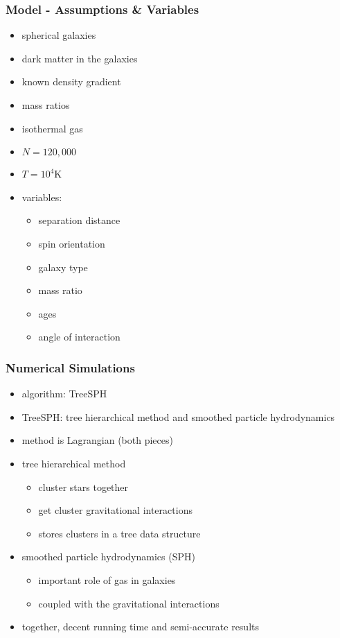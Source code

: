 \documentclass{beamer}
\begin{document}
\begin{frame}
  \frametitle{Model - Assumptions \& Variables}
  \begin{itemize}
    \item spherical galaxies
    \item dark matter in the galaxies
    \item known density gradient
    \item mass ratios
    \item isothermal gas
    \item $N = 120,000$
    \item $T = 10^4 $K
    \item variables:
    \begin{itemize}
      \item separation distance
      \item spin orientation
      \item galaxy type
      \item mass ratio
      \item ages
      \item angle of interaction
    \end{itemize}
  \end{itemize}
\end{frame}

\begin{frame}
  \frametitle{Numerical Simulations}
  \begin{itemize}
    \item algorithm: TreeSPH
    \item TreeSPH: tree hierarchical method and smoothed particle hydrodynamics
    \item method is Lagrangian (both pieces)
    \item tree hierarchical method
    \begin{itemize}
      \item cluster stars together
      \item get cluster gravitational interactions
      \item stores clusters in a tree data structure
    \end{itemize}
    \item smoothed particle hydrodynamics (SPH)
    \begin{itemize}
      \item important role of gas in galaxies
      \item coupled with the gravitational interactions
    \end{itemize}
    \item together, decent running time and semi-accurate results
  \end{itemize}
\end{frame}
\end{document}
